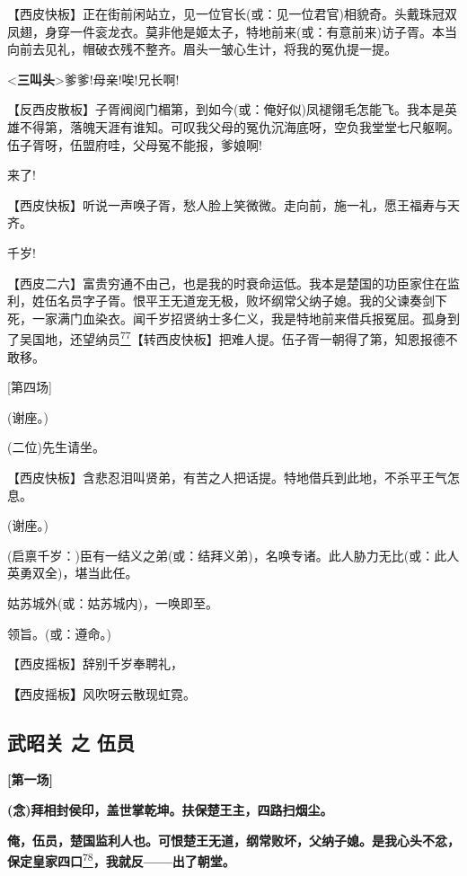 【西皮快板】正在街前闲站立，见一位官长(或：见一位君官)相貌奇。头戴珠冠双凤翅，身穿一件衮龙衣。莫非他是姬太子，特地前来(或：有意前来)访子胥。本当向前去见礼，帽破衣残不整齐。眉头一皱心生计，将我的冤仇提一提。

\textless{}\textbf{三叫头}\textgreater{}爹爹!母亲!唉!兄长啊!

【反西皮散板】子胥阀阅门楣第，到如今(或：俺好似)凤褪翎毛怎能飞。我本是英雄不得第，落魄天涯有谁知。可叹我父母的冤仇沉海底呀，空负我堂堂七尺躯啊。伍子胥呀，伍盟府哇，父母冤不能报，爹娘啊!

来了!

【西皮快板】听说一声唤子胥，愁人脸上笑微微。走向前，施一礼，愿王福寿与天齐。

千岁!

【西皮二六】富贵穷通不由己，也是我的时衰命运低。我本是楚国的功臣家住在监利，姓伍名员字子胥。恨平王无道宠无极，败坏纲常父纳子媳。我的父谏奏剑下死，一家满门血染衣。闻千岁招贤纳士多仁义，我是特地前来借兵报冤屈。孤身到了吴国地，还望纳员\protect\hyperlink{fn77}{\textsuperscript{77}}【转西皮快板】把难人提。伍子胥一朝得了第，知恩报德不敢移。

{[}第四场{]}

(谢座。)

(二位)先生请坐。

【西皮快板】含悲忍泪叫贤弟，有苦之人把话提。特地借兵到此地，不杀平王气怎息。

(谢座。)

(启禀千岁：)臣有一结义之弟(或：结拜义弟)，名唤专诸。此人胁力无比(或：此人英勇双全)，堪当此任。

姑苏城外(或：姑苏城内)，一唤即至。

领旨。(或：遵命。)

【西皮摇板】辞别千岁奉聘礼，

\textbf{【}西皮摇板\textbf{】}风吹呀云散现虹霓。

\hypertarget{ux6b66ux662dux5173-ux4e4b-ux4f0dux5458}{%
\subsection{武昭关 之
伍员}\label{ux6b66ux662dux5173-ux4e4b-ux4f0dux5458}}

\textbf{{[}第一场{]}}

\textbf{(念)拜相封侯印，盖世掌乾坤。扶保楚王主，四路扫烟尘。}

\textbf{俺，伍员，楚国监利人也。可恨楚王无道，纲常败坏，父纳子媳。是我心头不忿，保定皇家四口}\protect\hyperlink{fn78}{\textsuperscript{78}}\textbf{，我就反------出了朝堂。}

